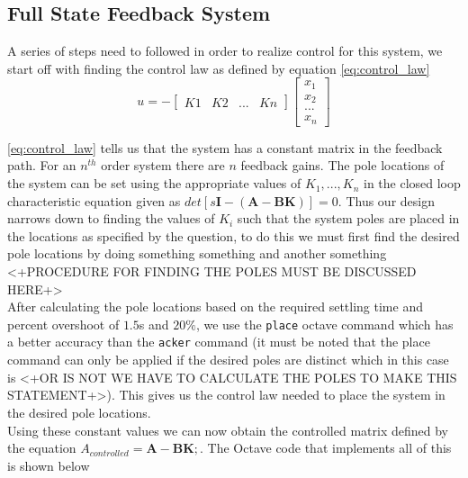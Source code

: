 \documentclass[a4paper, 12pt]{article}
\begin{document}

\subsection{Full State Feedback System} %
\label{sub:full_state_feedback_system}
A series of steps need to followed in order to realize control for this system, we start off with finding the control law as defined by equation \eqref{eq:control_law}
\begin{equation}
  u = -\left[
  \begin{array}{cccc}
    K1&K2&...&Kn
  \end{array}
  \right]
  \left[
  \begin{array}{c}
    x_1 \\
    x_2\\
    ...\\
    x_n
  \end{array}
  \right]
  \label{eq:control_law}
\end{equation}

\eqref{eq:control_law} tells us that the system has a constant matrix in the feedback path. For an $n^{th}$ order system there are $n$ feedback gains. The pole locations of the system can be set using the appropriate values  of $K_1, ... , K_n$ in the closed loop characteristic equation given as $det[s\textbf{I}-(\textbf{A}-\textbf{BK})] = 0$. Thus our design narrows down to finding the values of $K_i$ such that the system poles are placed in the locations as specified by the question, to do this we must first find the desired pole locations by doing something something and another something <+PROCEDURE FOR FINDING THE POLES MUST BE DISCUSSED HERE+>\\

After calculating the pole locations based on the required settling time and percent overshoot of $1.5$s and $20\%$, we use the \texttt{place} octave command which has a better accuracy than the \texttt{acker} command (it must be noted that the place command can only be applied if the desired poles are distinct which in this case is <+OR IS NOT WE HAVE TO CALCULATE THE POLES TO MAKE THIS STATEMENT+>). This gives us the control law needed to place the system in the desired pole locations.\\

Using these constant values we can now obtain the controlled matrix defined by the equation $A_{controlled} = \textbf{A}-\textbf{B}\textbf{K};$. The Octave code that implements all of this is shown below
\end{document}
